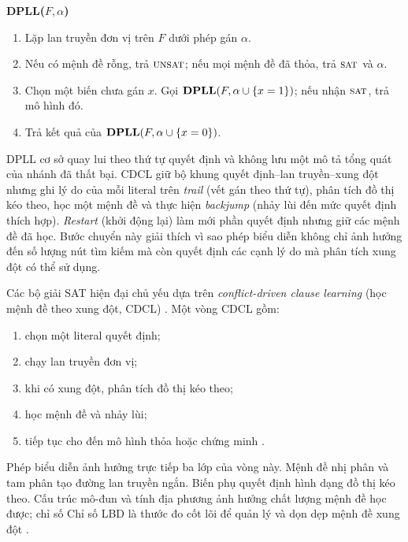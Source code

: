 \begin{algorithm}[H]
\caption{Khung DPLL cơ sở}
\label{alg:dpll}
\begin{minipage}{.94\textwidth}\small
\textbf{DPLL(\(F,\alpha\))}
\begin{enumerate}
  \item Lặp lan truyền đơn vị trên \(F\) dưới phép gán \(\alpha\).
  \item Nếu có mệnh đề rỗng, trả \(\textsc{unsat}\); nếu mọi mệnh đề đã thỏa, trả
  \(\textsc{sat}\) và \(\alpha\).
  \item Chọn một biến chưa gán \(x\). Gọi
  \(\textbf{DPLL}(F,\alpha\cup\left\{x=1\right\})\); nếu nhận \(\textsc{sat}\), trả mô hình đó.
  \item Trả kết quả của
  \(\textbf{DPLL}(F,\alpha\cup\left\{x=0\right\})\).
\end{enumerate}
\end{minipage}
\end{algorithm}

DPLL cơ sở quay lui theo thứ tự quyết định và không lưu một mô tả tổng quát
của nhánh đã thất bại. CDCL giữ bộ khung quyết định--lan truyền--xung đột nhưng
ghi lý do của mỗi literal trên \emph{trail} (vết gán theo thứ tự), phân tích đồ thị kéo theo, học
một mệnh đề và thực hiện \emph{backjump} (nhảy lùi đến mức quyết định thích
hợp). \emph{Restart} (khởi động lại)
làm mới phần quyết định nhưng giữ các mệnh đề đã học. Bước chuyển này giải thích vì sao phép biểu diễn
không chỉ ảnh hưởng đến số lượng nút tìm kiếm mà còn quyết định các cạnh lý do mà phân tích xung đột
có thể sử dụng.

Các bộ giải SAT hiện đại chủ yếu dựa trên
\emph{conflict-driven clause learning} (học mệnh đề theo xung đột, CDCL)
\parencite{marquessilva2009cdcl,een2003minisat}. Một vòng CDCL gồm:
\begin{enumerate}
  \item chọn một literal quyết định;
  \item chạy lan truyền đơn vị;
  \item khi có xung đột, phân tích đồ thị kéo theo;
  \item học mệnh đề và nhảy lùi;
  \item tiếp tục cho đến mô hình thỏa hoặc chứng minh \UNSAT.
\end{enumerate}

Phép biểu diễn ảnh hưởng trực tiếp ba lớp của vòng này. Mệnh đề nhị phân và tam
phân tạo đường lan truyền ngắn. Biến phụ quyết định hình dạng đồ thị kéo theo.
Cấu trúc mô-đun và tính địa phương ảnh hưởng chất lượng mệnh đề học được; chỉ số
Chỉ số LBD là thước đo cốt lõi để quản lý và dọn dẹp mệnh đề xung đột
\parencite{audemard2009lbd}.

